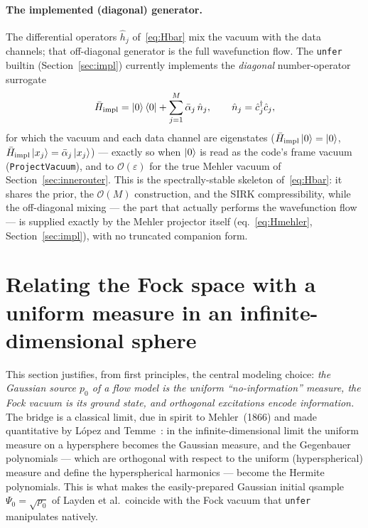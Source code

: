 \documentclass[11pt, a4paper]{article}
\begin{document}
\paragraph{The implemented (diagonal) generator.}
The differential operators $\hat h_j$ of~\eqref{eq:Hbar} mix the vacuum with
the data channels; that off-diagonal generator is the full wavefunction flow.
The \texttt{unfer} builtin (Section~\ref{sec:impl}) currently implements the
\emph{diagonal} number-operator surrogate
\begin{equation}
  \bar H_{\text{impl}}=\ket{0}\bra{0}+\sum_{j=1}^M\bar\alpha_j\,\hat n_j,
  \qquad \hat n_j=\hat c_j^\dagger\hat c_j ,
  \label{eq:Hdiag}
\end{equation}
for which the vacuum and each data channel are eigenstates
($\bar H_{\text{impl}}\ket{0}=\ket{0}$,
$\bar H_{\text{impl}}\ket{x_j}=\bar\alpha_j\ket{x_j}$) --- exactly so when
$\ket{0}$ is read as the code's frame vacuum
(\texttt{ProjectVacuum}), and to $\mathcal{O}(\varepsilon)$ for the true
Mehler vacuum of Section~\ref{sec:innerouter}. This is the
spectrally-stable skeleton of~\eqref{eq:Hbar}: it shares the prior, the
$\mathcal{O}(M)$ construction, and the SIRK compressibility, while the
off-diagonal mixing --- the part that actually performs the wavefunction
flow --- is supplied exactly by the Mehler projector itself
(eq.~\eqref{eq:Hmehler}, Section~\ref{sec:impl}), with no truncated
companion form.

\section{Relating the Fock space with a uniform measure in an
infinite-dimensional sphere}
\label{sec:mehler}

This section justifies, from first principles, the central modeling choice:
\emph{the Gaussian source $p_0$ of a flow model is the uniform
``no-information'' measure, the Fock vacuum is its ground state, and orthogonal
excitations encode information.} The bridge is a classical limit, due in spirit
to Mehler~(1866) and made quantitative by L\'opez and
Temme~\cite{LopezTemme1999}: in the infinite-dimensional limit the uniform
measure on a hypersphere becomes the Gaussian measure, and the Gegenbauer
polynomials --- which are orthogonal with respect to the uniform
(hyperspherical) measure and define the hyperspherical harmonics --- become
the Hermite polynomials. This is what makes the easily-prepared Gaussian
initial qsample $\Psi_0=\sqrt{p_0}$ of Layden et al.\ coincide with the Fock
vacuum that \texttt{unfer} manipulates natively.
\end{document}
